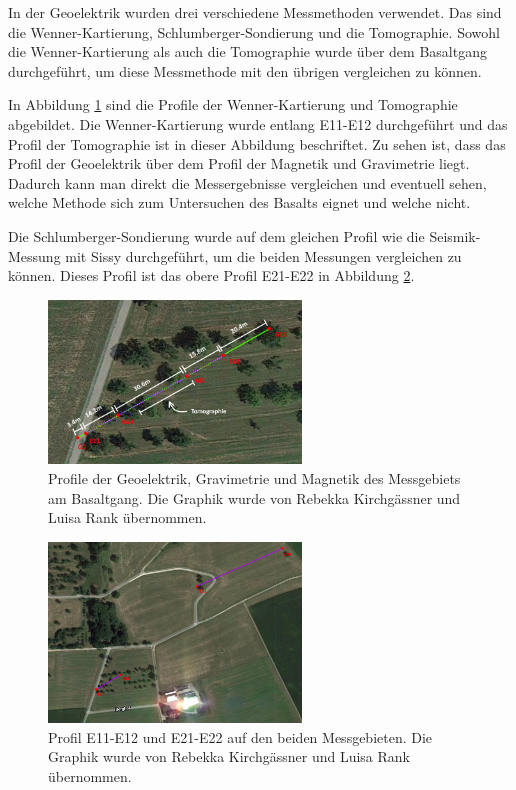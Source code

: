 In der Geoelektrik wurden drei verschiedene Messmethoden verwendet. Das sind die Wenner-Kartierung, Schlumberger-Sondierung und die Tomographie. Sowohl die Wenner-Kartierung als auch die Tomographie wurde über dem Basaltgang durchgeführt, um diese Messmethode mit den übrigen vergleichen zu können.

In Abbildung \ref{abb:PBasalt} sind die Profile der Wenner-Kartierung und Tomographie abgebildet. Die Wenner-Kartierung wurde entlang E11-E12 durchgeführt und das Profil der Tomographie ist in dieser Abbildung beschriftet. Zu sehen ist, dass das Profil der Geoelektrik über dem Profil der Magnetik und Gravimetrie liegt. Dadurch kann man direkt die Messergebnisse vergleichen und eventuell sehen, welche Methode sich zum Untersuchen des Basalts eignet und welche nicht.

Die Schlumberger-Sondierung wurde auf dem gleichen Profil wie die Seismik-Messung mit Sissy durchgeführt, um die beiden Messungen vergleichen zu können. Dieses Profil ist das obere Profil E21-E22 in Abbildung \ref{abb:PWiese}.

\begin{figure}[ht]
\centering
\includegraphics[width=0.6\textwidth]{fig/ElektrikMagnetikGravimetrie0gps.png}
\caption[Profile der Geoelektrik, Gravimetrie und Magnetik des Messgebiets am Basaltgang]{Profile der Geoelektrik, Gravimetrie und Magnetik des Messgebiets am Basaltgang. Die Graphik wurde von Rebekka Kirchgässner und Luisa Rank übernommen.}
\label{abb:PBasalt}
\end{figure}

\begin{figure}[ht]
\centering
\includegraphics[width=0.6\textwidth]{fig/profilegps.PNG}
\caption[Profil E11-E12 und E21-E22 auf den beiden Messgebieten]{Profil E11-E12 und E21-E22 auf den beiden Messgebieten. Die Graphik wurde von Rebekka Kirchgässner und Luisa Rank übernommen.}
\label{abb:PWiese}
\end{figure}
\newpage

